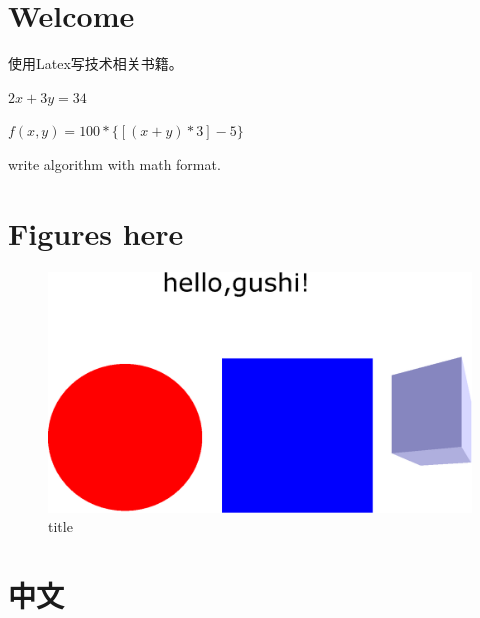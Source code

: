 \documentclass[a4paper,12pt]{article}
\begin{document}


\section{Welcome}

使用Latex写技术相关书籍。

$2x+3y=34$


$f(x, y) = 100 * \lbrace[(x + y) * 3] - 5\rbrace$

write algorithm with math format.








\section{Figures here}
\begin{figure}
\centering
\includegraphics[width=\textwidth]{hello.eps}
\caption{title}
\end{figure}

\section{中文}
\end{document}
